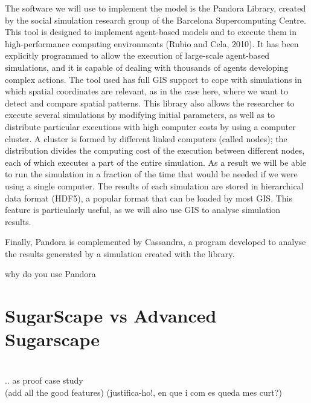 \documentclass{report}
\begin{document}
		The software we will use to implement the model is the Pandora Library, created by the social simulation
		research group of the Barcelona Supercomputing Centre. This tool is designed to implement agent-based 
		models and to execute them in high-performance computing environments (Rubio and Cela, 2010). It has been 
		explicitly programmed to allow the execution of large-scale agent-based simulations, and it is capable of 
		dealing with thousands of agents developing complex actions. The tool used has full GIS support to cope 
		with simulations in which spatial coordinates are relevant, as in the case here, where we want to detect 
		and compare spatial patterns. This library also allows the researcher to execute several simulations by 
		modifying initial parameters, as well as to distribute particular executions with high computer costs by 
		using a computer cluster. A cluster is formed by different linked computers (called nodes); the distribution 
		divides the computing cost of the execution between different nodes, each of which executes a part of the 
		entire simulation. As a result we will be able to run the simulation in a fraction of the time that would 
		be needed if we were using a single computer. The results of each simulation are stored in hierarchical data 
		format (HDF5), a popular format that can be loaded by most GIS. This feature is particularly useful, as we 
		will also use GIS to analyse simulation results.

		Finally, Pandora is complemented by Cassandra, a program developed to analyse the results generated by a simulation created
		with the library. 

		why do you use Pandora

\newpage 
\chapter{SugarScape vs Advanced Sugarscape} %

\\


 .. as proof case study
\\

		(add all the good features) (justifica-ho!, en que i com es queda mes curt?)
      
\end{document}
